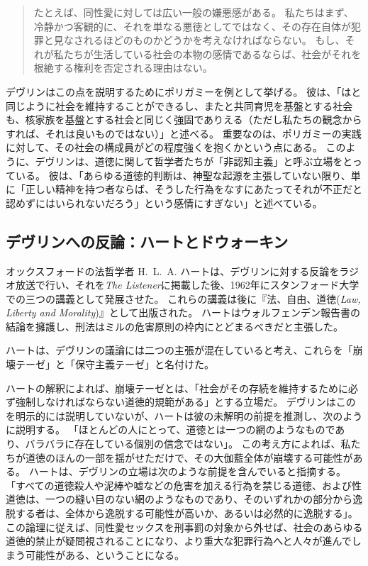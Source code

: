 \documentclass[paper=a4,book,openany]{jlreq} \usepackage{mystyle}
\begin{document}
\begin{quote}
たとえば、同性愛に対しては広い一般の嫌悪感がある。
私たちはまず、冷静かつ客観的に、それを単なる悪徳としてではなく、その存在自体が犯罪と見なされるほどのものかどうかを考えなければならない。
もし、それが私たちが生活している社会の本物の感情であるならば、社会がそれを根絶する権利を否定される理由はない\citep[p.40]{devlin65:_enfor_moral}。
\end{quote}

デヴリンはこの点を説明するためにポリガミーを例として挙げる。
彼は、「はと同じように社会を維持することができるし、またと共同育児を基盤とする社会も、核家族を基盤とする社会と同じく強固でありえる（ただし私たちの観念からすれば、それは良いものではない）」と述べる\citep[p.114]{devlin65:_enfor_moral}。
重要なのは、ポリガミーの実践に対して、その社会の構成員がどの程度強くを抱くかという点にある。
このように、デヴリンは、道徳に関して哲学者たちが「非認知主義」と呼ぶ立場をとっている。
彼は、「あらゆる道徳的判断は、神聖な起源を主張していない限り、単に「正しい精神を持つ者ならば、そうした行為をなすにあたってそれが不正だと認めずにはいられないだろう」という感情にすぎない」と述べている\citep[p.17]{devlin65:_enfor_moral}。

\subsection{デヴリンへの反論：ハートとドウォーキン}

オックスフォードの法哲学者 H.~L.~A. ハートは、デヴリンに対する反論をラジオ放送で行い、それを\emph{The Listener}に掲載した後、1962年にスタンフォード大学での三つの講義として発展させた。
これらの講義は後に『法、自由、道徳(\emph{Law, Liberty and Morality})』として出版された。
ハートはウォルフェンデン報告書の結論を擁護し、刑法はミルの危害原則の枠内にとどまるべきだと主張した。

ハートは、デヴリンの議論には二つの主張が混在していると考え、これらを「崩壊テーゼ」と「保守主義テーゼ」と名付けた\citep[p.115]{hart63:_law_liber_and_moral}。

ハートの解釈によれば、崩壊テーゼとは、「社会がその存続を維持するために必ず強制しなければならない道徳的規範がある」とする立場だ。
デヴリンはこのを明示的には説明していないが、ハートは彼の未解明の前提を推測し、次のように説明する。
「ほとんどの人にとって、道徳とは一つの網のようなものであり、バラバラに存在している個別の信念ではない」\citep[pp. 50--51]{hart63:_law_liber_and_moral}。
この考え方によれば、私たちが道徳のほんの一部を揺がせただけで、その大伽藍全体が崩壊する可能性がある。
ハートは、デヴリンの立場は次のような前提を含んでいると指摘する。
「すべての道徳{\DDASH}殺人や泥棒や嘘などの危害を加える行為を禁じる道徳、および性道徳{\DDASH}は、一つの縫い目のない網のようなものであり、そのいずれかの部分から逸脱する者は、全体から逸脱する可能性が高いか、あるいは必然的に逸脱する」\citep[p.50]{hart63:_law_liber_and_moral}。
この論理に従えば、同性愛セックスを刑事罰の対象から外せば、社会のあらゆる道徳的禁止が疑問視されることになり、より重大な犯罪行為へと人々が進んでしまう可能性がある、ということになる。
\end{document}

